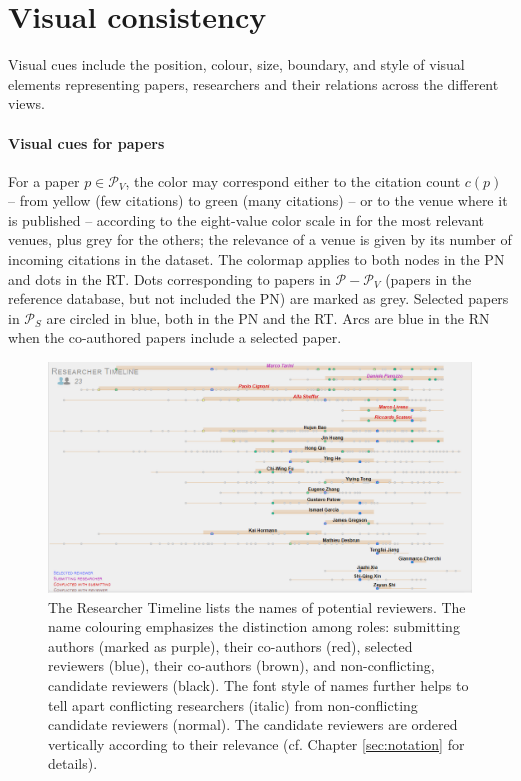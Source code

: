 \section{Visual consistency}
\label{subsec:visualvar}

Visual cues include the position, colour, size, boundary, and style of visual elements representing papers, researchers and their relations across the different views.  

\paragraph*{Visual cues for papers} 
For a paper $p \in \mathcal{P}_{V}$, the color may correspond either to the citation count $c(p)$ -- from yellow (few citations) to green (many citations) -- or to the venue where it is published -- according to the eight-value color scale in \cite{Wa13} for the most relevant venues, plus grey for the others; the relevance of a venue is given by its number of incoming citations in the dataset. The colormap applies to both nodes in the PN and dots in the RT. Dots corresponding to papers in $\mathcal{P} - \mathcal{P}_V$ (papers in the reference database, but not included the PN) are marked as grey. 
Selected papers in $\mathcal{P}_S$ are circled in blue, both in the PN and the RT.  Arcs are blue in the RN when the co-authored papers include a selected paper.  


\begin{figure}[!t]
    \centering
    \includegraphics[width=\textwidth]{fig/timeline_cropped.png}
    \caption{The Researcher Timeline lists the names of potential reviewers. The name colouring emphasizes the distinction among roles: submitting authors (marked as purple), their co-authors (red), selected reviewers (blue), their co-authors (brown), and non-conflicting, candidate reviewers (black). The font style of names further helps to tell apart conflicting researchers (italic) from non-conflicting candidate reviewers (normal). The candidate reviewers are ordered vertically according to their relevance (cf. Chapter \ref{sec:notation} for details).}%
    \label{fig:selected}
\end{figure}


